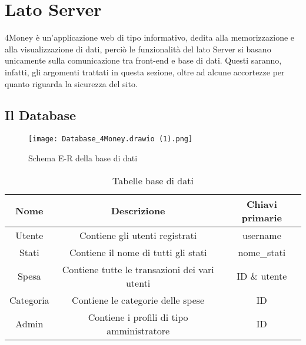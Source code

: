 \documentclass[binding=0.6cm, oneside, noexaminfo, italian]{sapthesis}
\begin{document}
\section{Lato Server}
4Money è un'applicazione web di tipo informativo, dedita alla memorizzazione e alla visualizzazione di dati, perciò le funzionalità del lato Server si basano unicamente sulla comunicazione tra front-end e base di dati. Questi saranno, infatti, gli argomenti trattati in questa sezione, oltre ad alcune accortezze per quanto riguarda la sicurezza del sito.
\subsection{Il Database}
\begin{figure}[h]
    \centering
    \texttt{[image: Database\_4Money.drawio (1).png]}
    \caption{Schema E-R della base di dati}
    \label{fig:e-r_database}
\end{figure}

\newpage
\begin{table}[h]
    \centering
    \begin{tabularx}{\linewidth}{ccc}
        \toprule
        Nome & Descrizione & Chiavi primarie\\
        \midrule
        Utente & Contiene gli utenti registrati & username\\
        Stati & Contiene il nome di tutti gli stati & nome\_stati\\
        Spesa & Contiene tutte le transazioni dei vari utenti & ID \& utente\\
        Categoria & Contiene le categorie delle spese & ID\\
        Admin & Contiene i profili di tipo amministratore & ID\\
        \bottomrule
    \end{tabularx}
    \caption{Tabelle base di dati}
    \label{tab:tabelle}
\end{table}
\end{document}
